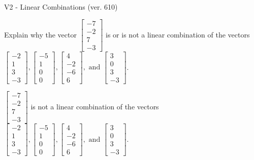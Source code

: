 \begin{exercise}
  \begin{exerciseTitle}V2 - Linear Combinations (ver. 610)\end{exerciseTitle}
  \begin{exerciseStatement}
    Explain why the vector \(\left[\begin{array}{c}
-7 \\
-2 \\
7 \\
-3
\end{array}\right]\)  is or is not a linear 
	combination of the vectors \(\left[\begin{array}{c}
-2 \\
1 \\
3 \\
-3
\end{array}\right] , \left[\begin{array}{c}
-5 \\
1 \\
0 \\
0
\end{array}\right] , \left[\begin{array}{c}
4 \\
-2 \\
-6 \\
6
\end{array}\right] , \text{ and } \left[\begin{array}{c}
3 \\
0 \\
3 \\
-3
\end{array}\right]\).
	


  \end{exerciseStatement}
  \begin{exerciseAnswer}
   \(\left[\begin{array}{c}
-7 \\
-2 \\
7 \\
-3
\end{array}\right]\) 
  	 is not  
	a linear combination of the vectors \(\left[\begin{array}{c}
-2 \\
1 \\
3 \\
-3
\end{array}\right] , \left[\begin{array}{c}
-5 \\
1 \\
0 \\
0
\end{array}\right] , \left[\begin{array}{c}
4 \\
-2 \\
-6 \\
6
\end{array}\right] , \text{ and } \left[\begin{array}{c}
3 \\
0 \\
3 \\
-3
\end{array}\right]\).


\end{exerciseAnswer}
\end{exercise}
